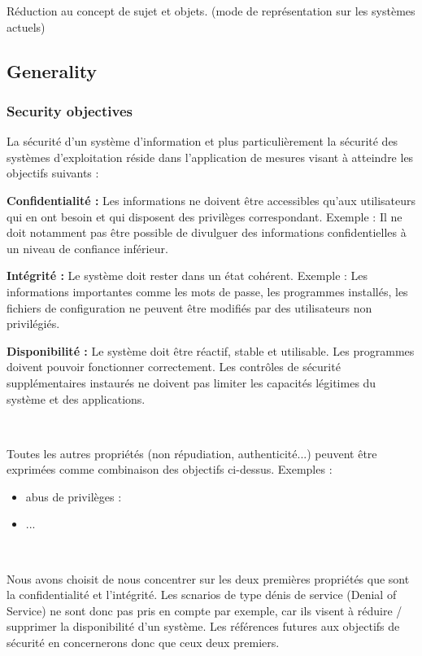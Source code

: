 \documentclass[pdftex,a4paper,titlepage,11pt]{article}
\begin{document}
Réduction au concept de sujet et objets. (mode de représentation sur les systèmes actuels)

\subsection{Generality}

\subsubsection{Security objectives}

La sécurité d'un système d'information et plus particulièrement la sécurité des systèmes d'exploitation réside dans l'application de mesures visant à atteindre les objectifs suivants :

\textbf{Confidentialité :}
Les informations ne doivent être accessibles qu'aux utilisateurs qui en ont besoin et qui disposent des privilèges correspondant. Exemple : Il ne doit notamment pas être possible de divulguer des informations confidentielles à un niveau de confiance inférieur.

\textbf{Intégrité :}
Le système doit rester dans un état cohérent. Exemple : Les informations importantes comme les mots de passe, les programmes installés, les fichiers de configuration ne peuvent être modifiés par des utilisateurs non privilégiés.

\textbf{Disponibilité :}
Le système doit être réactif, stable et utilisable. Les programmes doivent pouvoir fonctionner correctement. Les contrôles de sécurité supplémentaires instaurés ne doivent pas limiter les capacités légitimes du système et des applications.

~

Toutes les autres propriétés (non répudiation, authenticité...) peuvent être exprimées comme combinaison des objectifs ci-dessus. Exemples :
\begin{itemize}
	\item abus de privilèges :
	\item ...
\end{itemize}

~

Nous avons choisit de nous concentrer sur les deux premières propriétés que sont la confidentialité et l'intégrité. Les scnarios de type dénis de service (Denial of Service) ne sont donc pas pris en compte par exemple, car ils visent à réduire / supprimer la disponibilité d'un système. Les références futures aux objectifs de sécurité en concernerons donc que ceux deux premiers.
\end{document}
